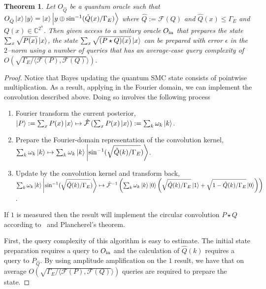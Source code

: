 \documentclass[aps,amsmath,onecolumn,amssymb,notitlepage]{revtex4-1}
\newtheorem{theorem}{Theorem}
\begin{document}
\begin{theorem}
Let  $O_{\hat{Q}}$ be a quantum oracle such that $O_{\hat{Q}}\left|x\right\rangle \left|y\right\rangle = \left|x\right\rangle \left|y\oplus \sin^{-1}(\hat{Q} (x)/\Gamma_E)\right\rangle$ where $\hat{Q}:=\mathcal{F}(Q)$ and $\hat{Q}(x)\le \Gamma_E$ and $Q(x) \in \mathbb{C}^{2^n}$.  Then given access to a unitary oracle $O_{\rm in}$ that prepares the state $\sum_x \sqrt{P(x)}\left|x\right\rangle$, the state $\sum_x \sqrt{(P\star Q) (x)}\left|x\right\rangle$ can be prepared with error $\epsilon$ in the $2$--norm using a number of queries that has an average-case query complexity of $O(\sqrt{\Gamma_E/ \langle \mathcal{F}(P), \mathcal{F}(Q)}\rangle)$.
\end{theorem}
\begin{proof}
Notice that Bayes updating the quantum SMC state consists of pointwise multiplication. As a result, applying  in the Fourier domain, we can implement the convolution described above.  Doing so involves the following process
\begin{enumerate}
\item  Fourier transform the current posterior, $\left|P\right\rangle:=\sum_x P(x) \left|x\right\rangle \mapsto \hat{\mathcal{F}}\left(\sum_x P(x) \left|x\right\rangle \right):= \sum_k \omega_k \left|k\right\rangle$.
\item Prepare the Fourier-domain representation of the convolution kernel, \\$\sum_k \omega_k \left|k\right\rangle\mapsto \sum_k \omega_k \left|k\right\rangle\left|\sin^{-1}(\sqrt{\hat{Q}(k)/\Gamma_E})\right\rangle$.
\item Update by the convolution kernel and transform back, \\$\sum_k \omega_k \left|k\right\rangle\left|\sin^{-1}(\sqrt{\hat{Q}(k)/\Gamma_E})\right\rangle\mapsto \hat{\mathcal{F}}^{-1}\left(\sum_k \omega_k \left|k\right\rangle\left|0\right\rangle\left(\sqrt{\hat{Q}(k)/\Gamma_E}\left|1\right\rangle+\sqrt{1-\hat{Q}(k)/\Gamma_E}\left|0\right\rangle \right)\right)$.
\end{enumerate}
If $1$ is measured then the result will implement the circular convolution $P \star Q$ according to~ and Plancherel's theorem.

First, the query complexity of this algorithm is easy to estimate.  The initial state preparation requires a query to $O_{\rm in}$ and the calculation of $\hat{Q}(k)$ requires a query to $P_{\hat{Q}}$.  By using amplitude amplification on the $1$ result, we have that on average $O(\sqrt{\Gamma_E/ \langle \mathcal{F}(P), \mathcal{F}(Q)}\rangle)$ queries are required to prepare the state.
\end{proof}
\end{document}
